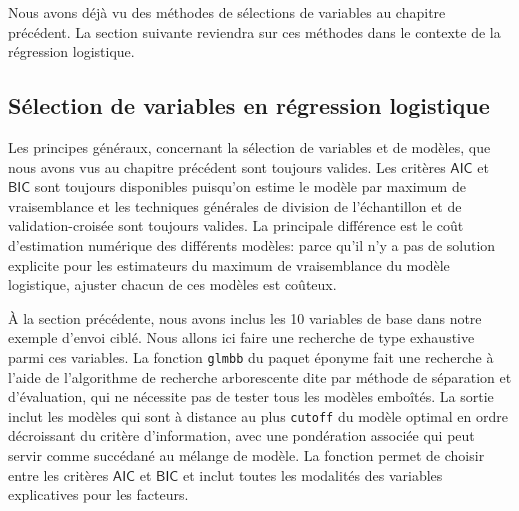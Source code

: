 \documentclass[
  11pt,
  letterpaper,
]{scrbook}
\theoremstyle{definition}
\theoremstyle{remark}
\begin{document}
Nous avons déjà vu des méthodes de sélections de variables au chapitre
précédent. La section suivante reviendra sur ces méthodes dans le
contexte de la régression logistique.

\hypertarget{suxe9lection-de-variables-en-ruxe9gression-logistique}{%
\subsection{Sélection de variables en régression
logistique}\label{suxe9lection-de-variables-en-ruxe9gression-logistique}}

Les principes généraux, concernant la sélection de variables et de
modèles, que nous avons vus au chapitre précédent sont toujours valides.
Les critères \(\mathsf{AIC}\) et \(\mathsf{BIC}\) sont toujours
disponibles puisqu'on estime le modèle par maximum de vraisemblance et
les techniques générales de division de l'échantillon et de
validation-croisée sont toujours valides. La principale différence est
le coût d'estimation numérique des différents modèles: parce qu'il n'y a
pas de solution explicite pour les estimateurs du maximum de
vraisemblance du modèle logistique, ajuster chacun de ces modèles est
coûteux.

À la section précédente, nous avons inclus les 10 variables de base dans
notre exemple d'envoi ciblé. Nous allons ici faire une recherche de type
exhaustive parmi ces variables. La fonction \texttt{glmbb} du paquet
éponyme fait une recherche à l'aide de l'algorithme de recherche
arborescente dite par méthode de séparation et d'évaluation, qui ne
nécessite pas de tester tous les modèles emboîtés. La sortie inclut les
modèles qui sont à distance au plus \texttt{cutoff} du modèle optimal en
ordre décroissant du critère d'information, avec une pondération
associée qui peut servir comme succédané au mélange de modèle. La
fonction permet de choisir entre les critères \(\mathsf{AIC}\) et
\(\mathsf{BIC}\) et inclut toutes les modalités des variables
explicatives pour les facteurs.
\end{document}
